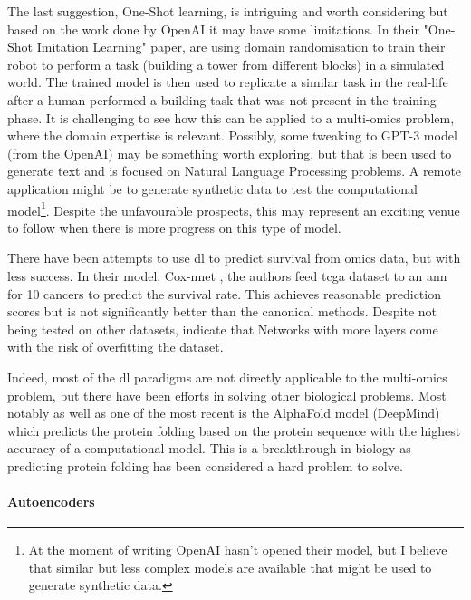 The last suggestion, One-Shot learning, is intriguing and worth considering but based on the work done by OpenAI it may have some limitations. In their "One-Shot Imitation Learning" paper, \citet{duan2017-ae} are using domain randomisation to train their robot to perform a task (building a tower from different blocks) in a simulated world. The trained model is then used to replicate a similar task in the real-life after a human performed a building task that was not present in the training phase. It is challenging to see how this can be applied to a multi-omics problem, where the domain expertise is relevant. Possibly, some tweaking to GPT-3\cite{Brown2020-wh} model (from the OpenAI) may be something worth exploring, but that is been used to generate text and is focused on Natural Language Processing problems. A remote application might be to generate synthetic data to test the computational model\footnote{At the moment of writing OpenAI hasn't opened their model, but I believe that similar but less complex models are available that might be used to generate synthetic data.}. Despite the unfavourable prospects, this may represent an exciting venue to follow when there is more progress on this type of model.

There have been attempts to use \acrshort{dl} to predict survival from omics data, but with less success. In their model, Cox-nnet \cite{Ching2018-gq}, the authors feed \acrshort{tcga} dataset to an \acrshort{ann} for 10 cancers to predict the survival rate. This achieves reasonable prediction scores but is not significantly better than the canonical methods. Despite not being tested on other datasets, \citet{Ching2018-gq} indicate that Networks with more layers come with the risk of overfitting the dataset.  


Indeed, most of the \acrshort{dl} paradigms are not directly applicable to the multi-omics problem, but there have been efforts in solving other biological problems. Most notably as well as one of the most recent is the AlphaFold model\cite{Jumper2021-du} (DeepMind) which predicts the protein folding based on the protein sequence with the highest accuracy of a computational model. This is a breakthrough in biology as predicting protein folding has been considered a hard problem to solve.


\paragraph*{Autoencoders} \label{s:lit:autoencoders}

